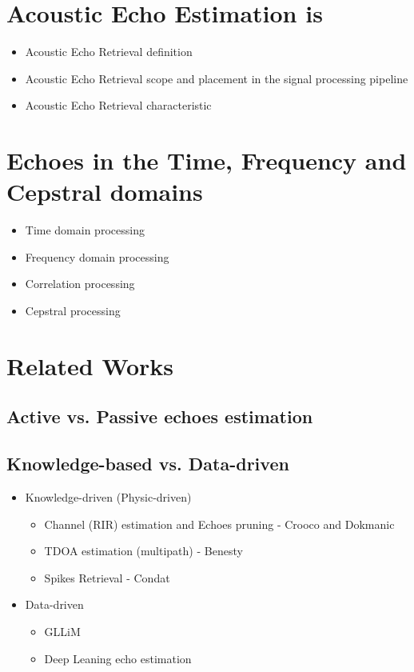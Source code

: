 

\section{Acoustic Echo Estimation is}

\begin{itemize}
    \item Acoustic Echo Retrieval definition
    \item Acoustic Echo Retrieval scope and placement in the signal processing pipeline
    \item Acoustic Echo Retrieval characteristic
\end{itemize}

\section{Echoes in the Time, Frequency and Cepstral domains}
\begin{itemize}
    \item Time domain processing
    \item Frequency domain processing
    \item Correlation processing
    \item Cepstral processing
\end{itemize}


\section{Related Works}
\subsection{Active vs. Passive echoes estimation}

\subsection{Knowledge-based vs. Data-driven}
\begin{itemize}
    \item Knowledge-driven (Physic-driven)
    \begin{itemize}
        \item Channel (RIR) estimation and Echoes pruning - Crooco and Dokmanic
        \item TDOA estimation (multipath) - Benesty
        \item Spikes Retrieval - Condat
    \end{itemize}
    \item Data-driven
    \begin{itemize}
        \item GLLiM
        \item Deep Leaning echo estimation
    \end{itemize}
\end{itemize}

